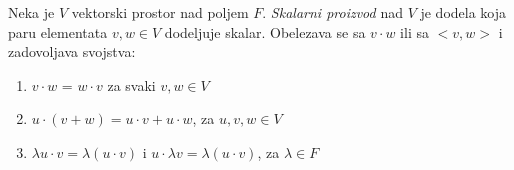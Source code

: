 \documentclass[12p,a4paper]{article}
\begin{document}
\begin{multicols}{2}
    Neka je $V$ vektorski prostor nad poljem $F$. \textit{Skalarni proizvod}  
    nad $V$ je dodela koja paru elementata $v, w \in V$ dodeljuje skalar.
    Obelezava se sa $v \cdot w$ ili sa $<v, w>$ i zadovoljava svojstva:
    \begin{enumerate}
        \itemsep0em
        \item $v \cdot w$ = $w \cdot v$ za svaki $v, w \in V$
        \item $u \cdot (v + w) = u \cdot v + u \cdot w$, za $u,v,w \in V$
        \item $\lambda u \cdot v = \lambda (u \cdot v)$ i 
            $u \cdot \lambda v = \lambda (u \cdot v)$, za $\lambda \in F$
    \end{enumerate}
 
\end{multicols}
\end{document}
